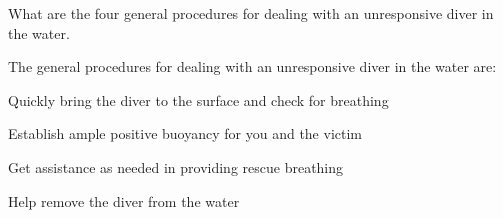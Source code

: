 	\begin{qanda}
		\begin{question}
What are the four general procedures for dealing with an unresponsive diver in the water.
		\end{question}

		\begin{answer}
The general procedures for dealing with an unresponsive diver in the water are:
			\begin{nospacenumberedlist}
				\item Quickly bring the diver to the surface and check for breathing
				\item Establish ample positive buoyancy for you and the victim
				\item Get assistance as needed in providing rescue breathing
				\item Help remove the diver from the water
			\end{nospacenumberedlist}
		\end{answer}
	\end{qanda} 